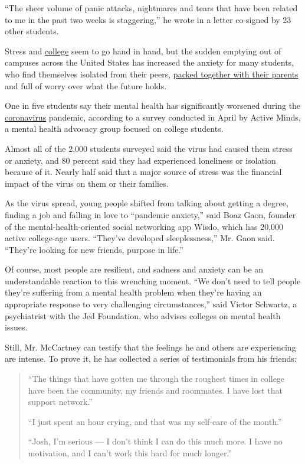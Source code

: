 ``The sheer volume of panic attacks, nightmares and tears that have been
related to me in the past two weeks is staggering,'' he wrote in a
letter co-signed by 23 other students.

Stress and
\href{https://www.nytimes.com/2020/06/25/sports/ncaafootball/college-football-coronavirus-cases.html}{college}
seem to go hand in hand, but the sudden emptying out of campuses across
the United States has increased the anxiety for many students, who find
themselves isolated from their peers,
\href{https://www.nytimes.com/2020/04/08/us/coronavirus-college-students.html}{packed
together with their parents} and full of worry over what the future
holds.

One in five students say their mental health has significantly worsened
during the
\href{https://www.nytimes.com/2020/07/03/your-money/students-unemployment-insurance-coronavirus.html}{coronavirus}
pandemic, according to a survey conducted in April by Active Minds, a
mental health advocacy group focused on college students.

Almost all of the 2,000 students surveyed said the virus had caused them
stress or anxiety, and 80 percent said they had experienced loneliness
or isolation because of it. Nearly half said that a major source of
stress was the financial impact of the virus on them or their families.

As the virus spread, young people shifted from talking about getting a
degree, finding a job and falling in love to ``pandemic anxiety,'' said
Boaz Gaon, founder of the mental-health-oriented social networking app
Wisdo, which has 20,000 active college-age users. ``They've developed
sleeplessness,'' Mr. Gaon said. ``They're looking for new friends,
purpose in life.''

Of course, most people are resilient, and sadness and anxiety can be an
understandable reaction to this wrenching moment. ``We don't need to
tell people they're suffering from a mental health problem when they're
having an appropriate response to very challenging circumstances,'' said
Victor Schwartz, a psychiatrist with the Jed Foundation, who advises
colleges on mental health issues.

Still, Mr. McCartney can testify that the feelings he and others are
experiencing are intense. To prove it, he has collected a series of
testimonials from his friends:

\begin{quote}
``The things that have gotten me through the roughest times in college
have been the community, my friends and roommates. I have lost that
support network.''

``I just spent an hour crying, and that was my self-care of the month.''

``Josh, I'm serious --- I don't think I can do this much more. I have no
motivation, and I can't work this hard for much longer.''
\end{quote}

